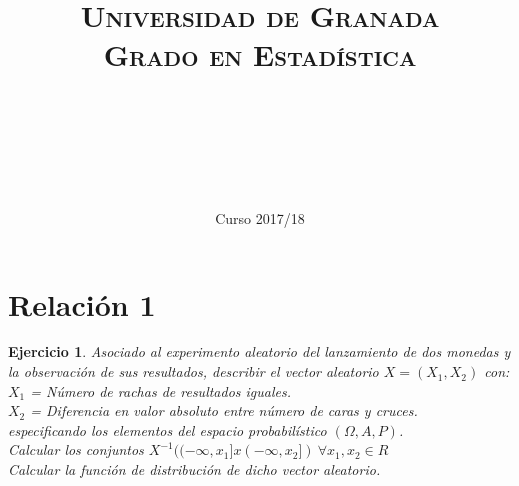 \documentclass[11pt, a4paper]{article}
\title{
  \normalfont \normalsize 
  \textsc{Universidad de Granada} \\ [25pt]    %
  \textsc{Grado en Estadística} \\ [25pt]    %
  \horrule{0.5pt} \\[0.4cm] %
  \huge \sffamily\subject\\ %
  \horrule{2pt} \\[0.5cm] %
}
\author{\Large\sffamily{\docauthor}}
\date{\vspace{-1.5em} \normalsize \sffamily Curso 2017/18}
\newif\IfInSansMode
\theoremstyle{theorem-style}
\theoremstyle{definition-style}
\newtheorem{ejer}{Ejercicio}[section]
\theoremstyle{remark-style}
\theoremstyle{example-style}
\begin{document}
\maketitle  %
\vfill
\begin{center}
\end{center}
\newpage
\tableofcontents    %
\newpage



\section{Relación 1}

\begin{ejer}
Asociado al experimento aleatorio del lanzamiento de dos monedas y la observación de sus resultados, describir el vector aleatorio $X = (X_1,X_2)$ con: \\
$X_1$ = Número de rachas de resultados iguales. \\
$X_2$ = Diferencia en valor absoluto entre número de caras y cruces. \\
especificando los elementos del espacio probabilístico $(\Omega,A,P)$. \\
Calcular los conjuntos $X^{-1}((-\infty,x_1]x(-\infty,x_2]) \ \forall x_1,x_2 \in R$ \\
Calcular la función de distribución de dicho vector aleatorio.
\end{ejer}
\end{document}
